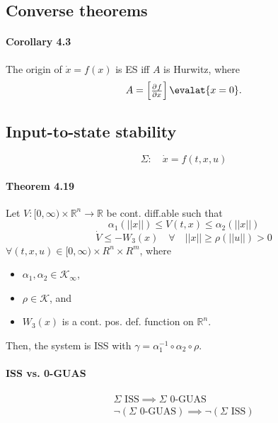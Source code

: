 \subsection{Converse theorems}
\paragraph{Corollary 4.3}
The origin of $\dot{x} = f(x)$ is ES iff $A$ is Hurwitz, where
\begin{equation}
	A =
	\begin{bmatrix}
		\pd{f}{x}
	\end{bmatrix}
	\evalat{x=0}
	.
\end{equation}

\subsection{Input-to-state stability}
\begin{equation}\label{eq:iss-system}
	\Sigma: \quad \dot{x} = f(t,x,u)
\end{equation}

\paragraph{Theorem 4.19}
Let $V : [0,\infty) \times \mathbb{R}^n \to \mathbb{R}$ be cont. diff.able such that
\begin{equation}
	\alpha_1 \left( ||x|| \right) \leq V(t,x) \leq \alpha_2 \left( ||x|| \right)
\end{equation}
\begin{equation}
	\dot{V} \leq -W_3(x) \quad \forall \quad ||x|| \geq \rho \left( ||u|| \right) > 0
\end{equation}
$\forall (t,x,u) \in [0,\infty) \times R^n \times R^m$, where
\begin{itemize}
	\item $\alpha_1, \alpha_2 \in \mathcal{K}_\infty$,
	\item $\rho \in \mathcal{K}$, and
	\item $W_3(x)$ is a cont. pos. def. function on $\mathbb{R}^n$.
\end{itemize}
Then, the system is ISS with $\gamma=\alpha_1^{-1} \circ \alpha_2 \circ \rho$.

\paragraph{ISS vs. 0-GUAS}
\begin{gather}
	\Sigma \mbox{ ISS} \implies \Sigma \mbox{ 0-GUAS} \\
	\neg (\Sigma \mbox{ 0-GUAS}) \implies \neg (\Sigma \mbox{ ISS})
\end{gather}


